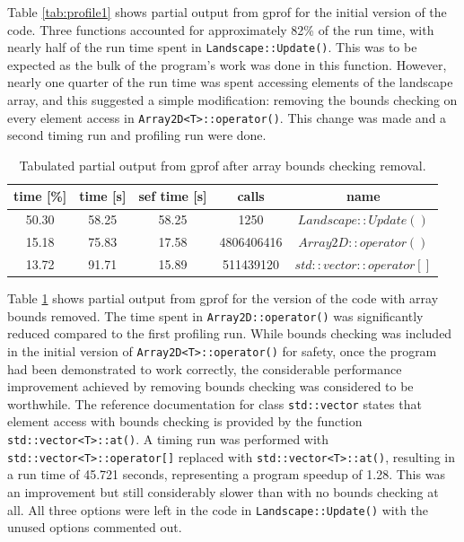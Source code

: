Table \ref{tab:profile1} shows partial output from gprof for the initial version of the code.
Three functions accounted for approximately 82\% of the run time, with nearly half of the run time spent in \texttt{Landscape::Update()}.
This was to be expected as the bulk of the program's work was done in this function.
However, nearly one quarter of the run time was spent accessing elements of the landscape array, and this suggested a simple modification: removing the bounds checking on every element access in \texttt{Array2D<T>::operator()}. 
This change was made and a second timing run and profiling run were done.

\begin{table}[h!]
\caption{Tabulated partial output from gprof after array bounds checking removal.}
\label{tab:profile2}
\begin{center}
\begin{tabular}{|c|c|c|c|c|}
\hline
time [\%] & time [s] & sef time [s] & calls & name\\
\hline
50.30 & 58.25 & 58.25 & 1250 & $Landscape::Update()$\\
\hline
15.18 & 75.83 & 17.58 & 4806406416 & $Array2D::operator()$\\
\hline
13.72 & 91.71 & 15.89 & 511439120 & $std::vector::operator[]$\\
\hline
\end{tabular}
\end{center}
\end{table}

Table \ref{tab:profile2} shows partial output from gprof for the version of the code with array bounds removed.  
The time spent in \texttt{Array2D::operator()} was significantly reduced compared to the first profiling run.  
While bounds checking was included in the initial version of \texttt{Array2D<T>::operator()} for safety, once the program had been demonstrated to work correctly, the considerable performance improvement achieved by removing bounds checking was considered to be worthwhile.
The reference documentation for class \texttt{std::vector} states that element access with bounds checking is provided by the function \texttt{std::vector<T>::at()}.
A timing run was performed with \texttt{std::vector<T>::operator[]} replaced with \texttt{std::vector<T>::at()}, resulting in a run time of 45.721 seconds, representing a program speedup of 1.28.
This was an improvement but still considerably slower than with no bounds checking at all. 
All three options were left in the code in \texttt{Landscape::Update()} with the unused options commented out.

